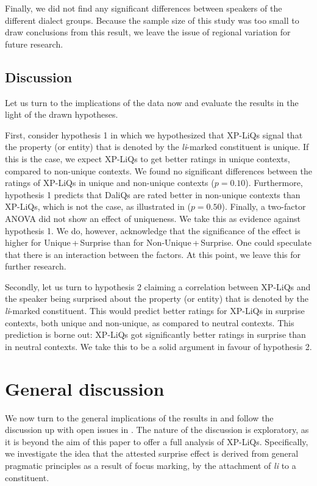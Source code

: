 \documentclass[output=paper,
colorlinks,
citecolor=brown,
newtxmath
]{langscibook}
\begin{document}
Finally, we did not find any significant differences between speakers of the different dialect groups. Because the sample size of this study was too small to draw conclusions from this result, we leave the issue of regional variation for future research.


\subsection{Discussion}\label{sec:discussion}
Let us turn to the implications of the data now and evaluate the results in the light of the drawn hypotheses.

First, consider hypothesis 1 in which we hypothesized that XP-LiQs signal that the property (or entity) that is denoted by the \textit{li}-marked constituent is unique. If this is the case, we expect XP-LiQs to get better ratings in unique contexts, compared to non-unique contexts. We found no significant differences between the ratings of XP-LiQs in unique and non-unique contexts ($p=0.10$). Furthermore, hypothesis 1 predicts that DaliQs are rated better in non-unique contexts than XP-LiQs, which is not the case, as illustrated in  ($p=0.50$). Finally, a two-factor ANOVA did not show an effect of uniqueness. We take this as evidence against hypothesis 1. We do, however, acknowledge that the significance of the effect is higher for Unique\,+\,Surprise than for Non-Unique\,+\,Surprise. One could speculate that there is an interaction between the factors. At this point, we leave this for further research.

Secondly, let us turn to hypothesis 2 claiming a correlation between XP-LiQs and the speaker being surprised about the property (or entity) that is denoted by the \textit{li}-marked constituent. This would predict better ratings for XP-LiQs in surprise contexts, both unique and non-unique, as compared to neutral contexts. This prediction is borne out: XP-LiQs got significantly better ratings in surprise than in neutral contexts. We take this to be a solid argument in favour of hypothesis 2.
\section{General discussion}\label{sec:analysis}
We now turn to the general implications of the results in  and follow the discussion up with open issues in . The nature of the discussion is exploratory, as it is beyond the aim of this paper to offer a full analysis of XP-LiQs. Specifically, we investigate the idea that the attested surprise effect is derived from general pragmatic principles as a result of focus marking, by the attachment of \textit{li} to a constituent.
\end{document}
